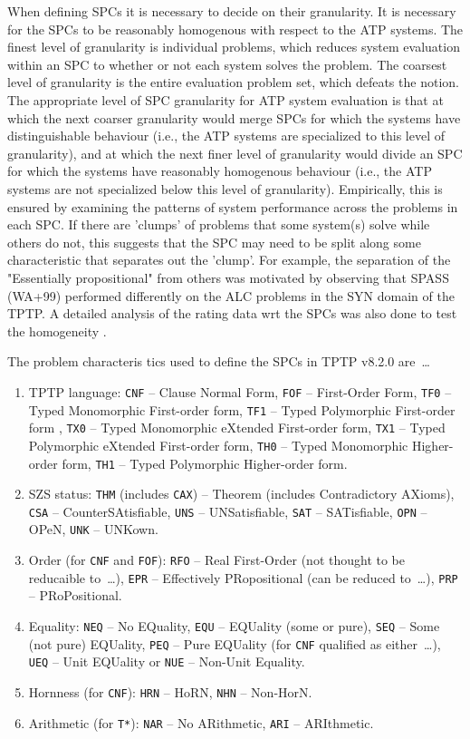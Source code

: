 \documentclass[runningheads]{llncs}
\begin{document}
When defining SPCs it is necessary to decide on their granularity. 
It is necessary for the SPCs to be reasonably homogenous with respect to the ATP systems.
The finest level of granularity is individual problems, which reduces system evaluation within an 
SPC to whether or not each system solves the problem. 
The coarsest level of granularity is the entire evaluation problem set, which defeats the notion. 
The appropriate level of SPC granularity for ATP system evaluation is that at which the next 
coarser granularity would merge SPCs for which the systems have distinguishable behaviour (i.e., 
the ATP systems are specialized to this level of granularity), and at which the next finer level 
of granularity would divide an SPC for which the systems have reasonably homogenous behaviour 
(i.e., the ATP systems are not specialized below this level of granularity).
Empirically, this is ensured by examining the patterns of system performance across the 
problems in each SPC. 
If there are 'clumps' of problems that some system(s) solve while others do not, this suggests 
that the SPC may need to be split along some characteristic that separates out the 'clump'. 
For example, the separation of the "Essentially propositional" from others was motivated by 
observing that SPASS (WA+99) performed differently on the ALC problems in the SYN domain of the 
TPTP.
A detailed analysis of the rating data wrt the SPCs was also done to test the homogeneity 
\cite{FS02}.

The problem characteris tics used to define the SPCs in TPTP v8.2.0 are~\ldots
\begin{enumerate}
\item TPTP language: 
      {\tt CNF} -- Clause Normal Form,
      {\tt FOF} -- First-Order Form,
      {\tt TF0} -- Typed Monomorphic First-order form,
      {\tt TF1} -- Typed Polymorphic First-order form ,
      {\tt TX0} -- Typed Monomorphic eXtended First-order form,
      {\tt TX1} -- Typed Polymorphic eXtended First-order form,
      {\tt TH0} -- Typed Monomorphic Higher-order form,
      {\tt TH1} -- Typed Polymorphic Higher-order form.
\item SZS status: 
      {\tt THM} (includes {\tt CAX}) -- Theorem (includes Contradictory AXioms),
      {\tt CSA} -- CounterSAtisfiable,
      {\tt UNS} -- UNSatisfiable,
      {\tt SAT} -- SATisfiable,
      {\tt OPN} -- OPeN,
      {\tt UNK} -- UNKown.
\item Order (for {\tt CNF} and {\tt FOF}): 
      {\tt RFO} -- Real First-Order (not thought to be reducaible to~\ldots),
      {\tt EPR} -- Effectively PRopositional (can be reduced to~\ldots),
      {\tt PRP} -- PRoPositional.
\item Equality: 
      {\tt NEQ} -- No EQuality,
      {\tt EQU} -- EQUality (some or pure),
      {\tt SEQ} -- Some (not pure) EQUality,
      {\tt PEQ} -- Pure EQUality (for {\tt CNF} qualified as either~\ldots),
      {\tt UEQ} -- Unit EQUality or
      {\tt NUE} -- Non-Unit Equality.
\item Hornness (for {\tt CNF}):
      {\tt HRN} -- HoRN,
      {\tt NHN} -- Non-HorN.
\item Arithmetic (for {\tt T*}):
      {\tt NAR} -- No ARithmetic,
      {\tt ARI} -- ARIthmetic.
\end{enumerate}
\end{document}

